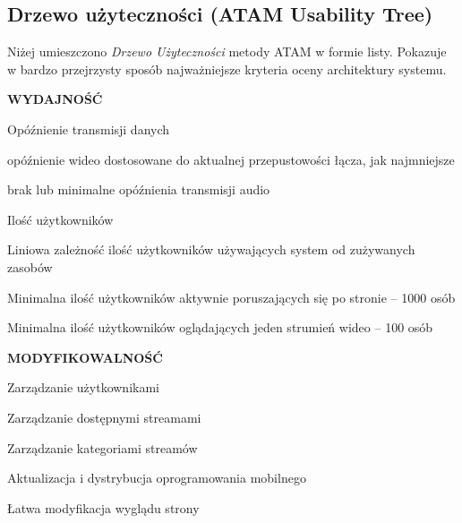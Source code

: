 \subsection{Drzewo użyteczności (ATAM Usability Tree)}
\label{sec:EtapIdrzewoUzytecznosci}

Niżej umieszczono \textit{Drzewo Użyteczności} metody ATAM w formie listy. Pokazuje w bardzo przejrzysty sposób najważniejsze kryteria oceny architektury systemu.

\begin{packed_item}
    \item{
        \textbf{WYDAJNOŚĆ}
        \begin{packed_item}
            \item{
                Opóźnienie transmisji danych
                \begin{packed_item}
                    \item{opóźnienie wideo dostosowane do aktualnej przepustowości łącza, jak najmniejsze}
                    \item{brak lub minimalne opóźnienia transmisji audio}
                \end{packed_item}
            }
            \item{
                Ilość użytkowników
                \begin{packed_item}
                    \item{Liniowa zależność ilość użytkowników używających system od zużywanych zasobów}
                    \item{Minimalna ilość użytkowników aktywnie poruszających się po stronie -- 1000 osób}
                    \item{Minimalna ilość użytkowników oglądających jeden strumień wideo -- 100 osób}
                \end{packed_item}
            }
        \end{packed_item}
    }
    \item{
        \textbf{MODYFIKOWALNOŚĆ}
        \begin{packed_item}
            \item{Zarządzanie użytkownikami}
            \item{Zarządzanie dostępnymi streamami}
            \item{Zarządzanie kategoriami streamów}
            \item{Aktualizacja i dystrybucja oprogramowania mobilnego}
            \item{Łatwa modyfikacja wyglądu strony}

\end{packed_item}}
\end{packed_item}
